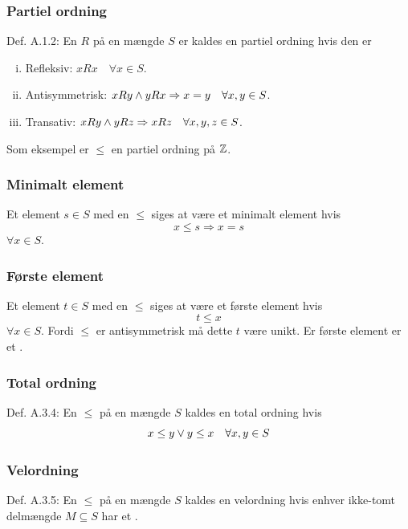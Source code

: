 \subsubsection{Partiel ordning}
\label{Partiel ordning}
Def. A.1.2: En  $R$ på en mængde $S$ er kaldes en partiel
ordning hvis den er
\begin{enumerate}[(i)]
  \item Refleksiv: $xRx \quad \forall x \in S$.
  \item Antisymmetrisk: $xRy \wedge yRx \Rightarrow x = y \quad \forall x,y
  \in S$.
  \item Transativ: $xRy \wedge yRz \Rightarrow xRz \quad \forall x,y,z \in S$.
\end{enumerate}
Som eksempel er $\leq$ en partiel ordning på $\mathbb{Z}$.

\subsubsection{Minimalt element}
\label{Minimalt element}
Et element $s \in S$ med en  $\leq$ siges at være et
minimalt element hvis
\begin{equation*}
  x \leq s \Rightarrow x = s
\end{equation*}
$\forall x \in S$.

\subsubsection{Første element}
\label{Foerste element}
Et element $t \in S$ med en  $\leq$ siges at være
et første element hvis
\begin{equation*}
  t \leq x
\end{equation*}
$\forall x \in S$. Fordi $\leq$ er antisymmetrisk må dette $t$ være unikt. Er
første element er et .

\subsubsection{Total ordning}
\label{Total ordning}
Def. A.3.4: En  $\leq$ på en mængde $S$ kaldes en total
ordning hvis
\begin{equation*}
  x \leq y \vee y \leq x \quad \forall x,y \in S
\end{equation*}

\subsubsection{Velordning}
\label{Velordning}
Def. A.3.5: En  $\leq$ på en mængde $S$ kaldes en
velordning hvis enhver ikke-tomt delmængde $M \subseteq S$ har et
.

